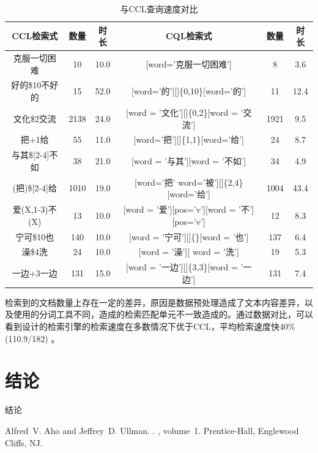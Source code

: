 \documentclass[11pt]{article}
\begin{document}
\begin{CJK*}{UTF8}{gbsn}
\begin{table}[h]
	\begin{center}
		\begin{tabular}{|c|c|c|c|c|c|}
			\hline \bf CCL检索式 & \bf 数量 & \bf 时长& \bf CQL检索式 & \bf 数量 & \bf 时长 \\ \hline
			克服一切困难 & 10 & 10.0 & [word='克服一切困难'] & 8 & 3.6 \\
			好的\$10不好的 &15 & 52.0 & [word='的'][]\{0,10\}[word='的'] & 11 & 12.4 \\
			文化\$2交流 & 2138 & 24.0 & [word = '文化'][]\{0,2\}[word = '交流'] & 1921 & 9.5 \\
			把+1给 & 55 & 11.0 & [word='把'][]\{1,1\}[word='给'] & 24 & 8.7 \\
			与其\$[2-4]不如 & 38 & 21.0 & [word = '与其'][word = '不如'] & 34 & 4.9 \\
			(把)\$[2-4]给 & 1010 & 19.0 & [word='把' \textbar word='被'][]\{2,4\}[word='给'] & 1004 & 43.4 \\
			爱(X,1-3)不(X) & 13 & 10.0 & [word = '爱'][pos='v'][word = '不'][pos='v'] & 12 & 8.3 \\
			宁可\$10也 & 140 & 10.0 & [word = '宁可'][]\{\}[word = '也'] & 137 & 6.4 \\
			澡\$4洗 & 24 & 10.0 & [word = '澡'][ word = '洗'] & 19 & 5.3 \\
			一边+3一边 & 131 & 15.0 & [word = '一边'][]\{3,3\}[word = '一边'] & 131 & 7.4 \\
			\hline
		\end{tabular}
	\end{center}
	\caption{\label{font-table} 与CCL查询速度对比}
\end{table}

检索到的文档数量上存在一定的差异，原因是数据预处理造成了文本内容差异，以及使用的分词工具不同，造成的检索匹配单元不一致造成的。通过数据对比，可以看到设计的检索引擎的检索速度在多数情况下优于CCL，平均检索速度快40\%(110.9/182) 。

\section{结论}

结论


%
%

\begin{thebibliography}{}

Alfred~V. Aho and Jeffrey~D. Ullman.
.
, volume~1.
\newblock Prentice-{Hall}, Englewood Cliffs, NJ.


\end{thebibliography}
\end{CJK*}
\end{document}
